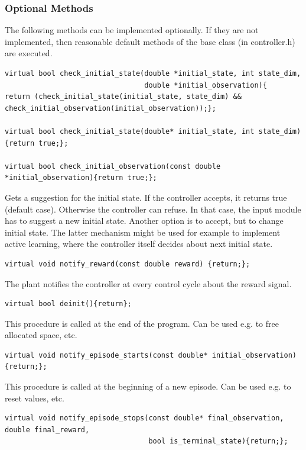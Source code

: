 \documentclass[a4paper,12pt,german]{article}
\begin{document}
\subsubsection{Optional Methods}

The following methods can be implemented optionally. If they are not implemented, then
reasonable default methods of the base class (in controller.h) are executed.


\begin{verbatim}
virtual bool check_initial_state(double *initial_state, int state_dim, 
                                 double *initial_observation){
return (check_initial_state(initial_state, state_dim) && 
check_initial_observation(initial_observation));}; 

virtual bool check_initial_state(double* initial_state, int state_dim){return true;};

virtual bool check_initial_observation(const double *initial_observation){return true;};
\end{verbatim}

Gets a suggestion for the initial state. If the controller accepts, it returns true (default case). Otherwise the 
controller can refuse. In that case, the input module has to suggest a new initial state. Another option is to accept, but 
to change initial state. The latter mechanism might be used for example to implement active learning, where the controller 
itself decides about next initial state.

\begin{verbatim}
virtual void notify_reward(const double reward) {return;};
\end{verbatim}

The plant notifies the controller at every control cycle about the reward signal.


\begin{verbatim}
virtual bool deinit(){return};
\end{verbatim}

This procedure is called at the end of the program. Can be used e.g. to free allocated space, etc.

\begin{verbatim}
virtual void notify_episode_starts(const double* initial_observation){return;};
\end{verbatim}

This procedure is called at the beginning of a new episode. Can be used e.g. to reset values, etc.

\begin{verbatim}
virtual void notify_episode_stops(const double* final_observation, double final_reward, 
                                  bool is_terminal_state){return;};
\end{verbatim}
\end{document}
